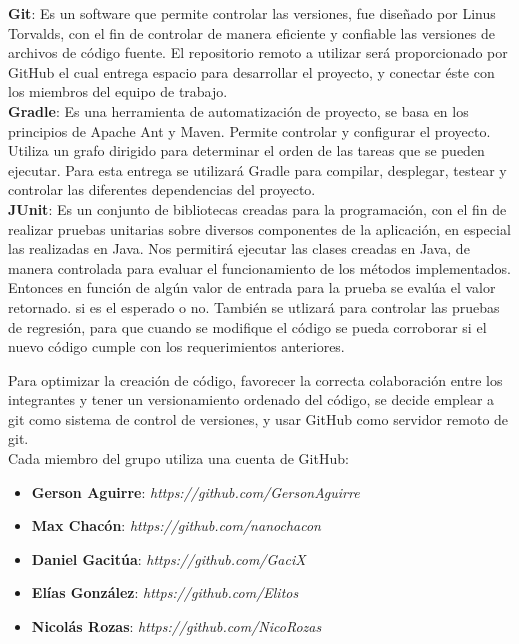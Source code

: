 \documentclass{memoria}
\begin{document}

\textbf{Git}: Es un software que permite controlar las versiones, fue diseñado por Linus Torvalds, con el fin de controlar de manera eficiente y confiable las versiones de archivos de código fuente. El repositorio remoto a utilizar será proporcionado por GitHub el cual entrega espacio para desarrollar el proyecto, y conectar éste con los miembros del equipo de trabajo.\\


\textbf{Gradle}: Es una herramienta de automatización de proyecto, se basa en los principios de Apache Ant y Maven. Permite controlar y configurar el proyecto. Utiliza un grafo dirigido para determinar el orden de las tareas que se pueden ejecutar. Para esta entrega se utilizará Gradle para compilar, desplegar, testear y controlar las diferentes dependencias del proyecto.\\

\textbf{JUnit}: Es un conjunto de bibliotecas creadas para la programación, con el fin de realizar pruebas unitarias sobre diversos componentes de la aplicación, en especial las realizadas en Java. Nos permitirá ejecutar las clases creadas en Java, de manera controlada para evaluar el funcionamiento de los métodos implementados. Entonces en función de algún valor de entrada para la prueba se evalúa el valor retornado. si es el esperado o no. También se utlizará para controlar las pruebas de regresión, para que cuando se modifique el código se pueda corroborar si el nuevo código cumple con los requerimientos anteriores.\\

\newpage

    
Para optimizar la creación de código, favorecer la correcta colaboración entre los integrantes y tener un versionamiento ordenado del código, se decide emplear a git como sistema de control de versiones, y usar GitHub como servidor remoto de git.\\

Cada miembro del grupo utiliza una cuenta de GitHub:

\begin{itemize}
	\item \textbf{Gerson Aguirre}: \textsl{https://github.com/GersonAguirre}
	\item \textbf{Max Chacón}: \textsl{https://github.com/nanochacon}
	\item \textbf{Daniel Gacitúa}: \textsl{https://github.com/GaciX}
	\item \textbf{Elías González}: \textsl{https://github.com/Elitos}
	\item \textbf{Nicolás Rozas}: \textsl{https://github.com/NicoRozas}
\end{itemize}
\end{document}

